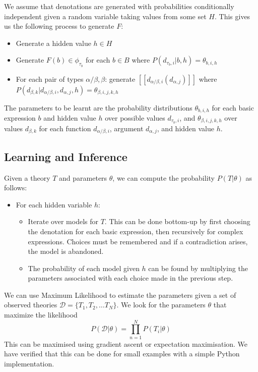 \documentclass[a4paper,11pt]{article}
\theoremstyle{definition}
\newcommand{\interp}[1]{[\![ #1 ]\!]}
\begin{document}
We assume that denotations are generated with probabilities
conditionally independent given a random variable taking values from
some set $H$. This gives us the following process to generate $F$:
\begin{itemize}
\item Generate a hidden value $h\in H$
\item Generate $F(b) \in \phi_{\tau_b}$ for each $b\in B$ where
  $P(d_{\tau_b,i}|b, h) = \theta_{b,i,h}$
\item For each pair of types $\alpha/\beta, \beta$: generate $\interp{d_{\alpha/\beta,i}(d_{\alpha,j})}$
where $P(d_{\beta,k}|d_{\alpha/\beta,i}, d_{\alpha,j},h) = \theta_{\beta,i,j,k,h}$
\end{itemize}
The parameters to be learnt are the probability distributions
$\theta_{b,i,h}$ for each basic expression $b$ and hidden value $h$
over possible values $d_{\tau_b,i}$, and $\theta_{\beta,i,j,k,h}$ over
values $d_{\beta,k}$ for each function $d_{\alpha/\beta,i}$, argument
$d_{\alpha,j}$, and hidden value $h$.

\subsection{Learning and Inference}

Given a theory $T$ and parameters $\theta$, we can compute the
probability $P(T|\theta)$ as follows:
\begin{itemize}
\item For each hidden variable $h$:
\begin{itemize}
\item Iterate over models for $T$. This can be done bottom-up
  by first choosing the denotation for each basic expression,
  then recursively for complex expressions. Choices must be
  remembered and if a contradiction arises, the
  model is abandoned.
\item The probability of each model given $h$ can be found by
  multiplying the parameters associated with each choice made in the
  previous step.
\end{itemize}
\end{itemize}

We can use Maximum Likelihood to estimate the parameters given a set
of observed theories $\mathcal{D} = \{T_1, T_2, \ldots T_N\}$. We look
for the parameters $\theta$ that maximize the likelihood
$$P(\mathcal{D}|\theta) = \prod_{n=1}^N P(T_i|\theta)$$ This can be
maximised using gradient ascent or expectation maximisation. We have
verified that this can be done for small examples with a simple Python
implementation.
\end{document}
